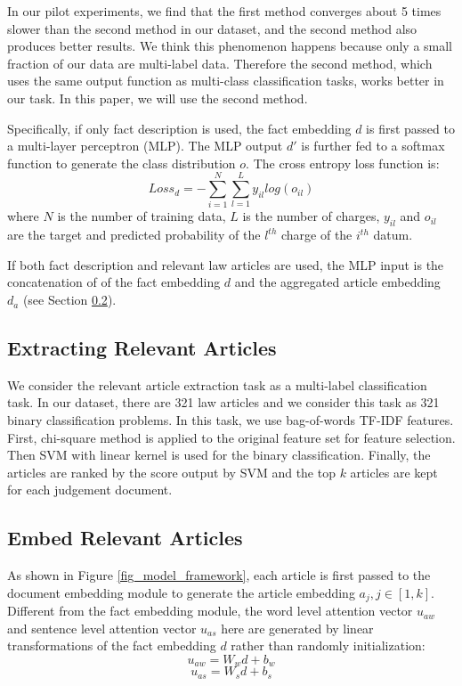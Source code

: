 In our pilot experiments, we find that the first method converges about 5 times slower than the second method in our dataset, and the second method also produces better results. We think this phenomenon happens because only a small fraction of our data are multi-label data. Therefore the second method, which uses the same output function as multi-class classification tasks, works better in our task. In this paper, we will use the second method.

Specifically, if only fact description is used, the fact embedding $d$ is first passed to a multi-layer perceptron (MLP). The MLP output $d'$ is further fed to a softmax function to generate the class distribution $o$. The cross entropy loss function is:
\begin{equation}
\label{original_loss}
Loss_d= -\sum_{i=1}^N\sum_{l=1}^L{y_{il} log(o_{il})}
\end{equation} 
where $N$ is the number of training data, $L$ is the number of charges, $y_{il}$ and $o_{il}$ are the target and predicted probability of the $l^{th}$ charge of the $i^{th}$ datum. 

If both fact description and relevant law articles are used, the MLP input is the concatenation of of the fact embedding $d$ and the aggregated article embedding $d_a$ (see Section \ref{Embed Relevant Articles}).

\subsection{Extracting Relevant Articles}
\label{Extracting Relevant Articles}
We consider the relevant article extraction task as a multi-label classification task. In our dataset, there are 321 law articles and we consider this task as 321 binary classification problems. 
In this task, we use bag-of-words TF-IDF features. First, chi-square method is applied to the original feature set for feature selection. Then SVM with linear kernel is used for the binary classification. Finally, the articles are ranked by the score output by SVM and the top $k$ articles are kept for each judgement document.

\subsection{Embed Relevant Articles}
\label{Embed Relevant Articles}
As shown in Figure \ref{fig_model_framework}, each article is first passed to the document embedding module to generate the article embedding $a_j, j\in [1, k]$. Different from the fact embedding module, the word level attention vector $u_{aw}$ and sentence level attention vector $u_{as}$ here are generated by linear transformations of the fact embedding $d$ rather than randomly initialization:
\begin{equation}
u_{aw} = W_w d + b_w
\end{equation}
\begin{equation}
u_{as} = W_s d + b_s
\end{equation}

